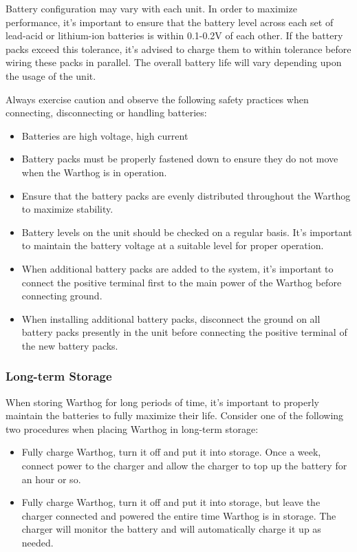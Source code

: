 \documentclass[]{clearpath-latex/clearpath-manual}
\begin{document}
Battery configuration may vary with each unit. In order to maximize performance, it's important to ensure that the battery level across each set of lead-acid or lithium-ion batteries is within 0.1-0.2V of each other. If the battery packs exceed this tolerance, it's advised to charge them to within tolerance before wiring these packs
in parallel. The overall battery life will vary depending upon the usage of the unit.

Always exercise caution and observe the following safety practices when connecting, disconnecting or handling batteries:

\begin{itemize}[nolistsep]
  \item Batteries are high voltage, high current
  \item Battery packs must be properly fastened down to ensure they do not move when the Warthog is in operation.
  \item Ensure that the battery packs are evenly distributed throughout the Warthog to maximize stability.
  \item Battery levels on the unit should be checked on a regular basis.  It's important to maintain the battery voltage at a suitable level for proper operation.
  \item When additional battery packs are added to the system, it's important to connect the positive terminal first to the main power of the Warthog before connecting ground.
  \item When installing additional battery packs, disconnect the ground on all battery packs presently in the unit before connecting the positive terminal of the new battery packs.
\end{itemize}

\subsubsection{Long-term Storage}

When storing Warthog for long periods of time, it's important to properly maintain the batteries to fully maximize their life.  Consider one of the following two procedures when placing Warthog in long-term storage:

\begin{itemize}[nolistsep]
  \item Fully charge Warthog, turn it off and put it into storage.  Once a week, connect power to the charger and allow the charger to top up the battery for an hour or so.
  \item Fully charge Warthog, turn it off and put it into storage, but leave the charger connected and powered the entire time Warthog is in storage.  The charger will monitor the battery and will automatically charge it up as needed.
\end{itemize}
\end{document}
